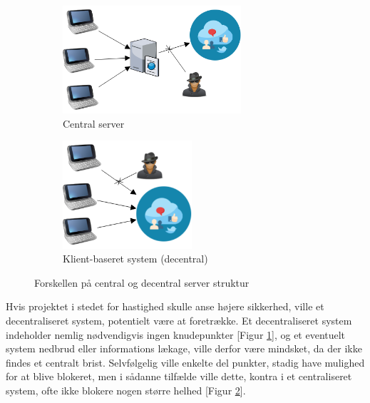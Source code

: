 \begin{figure}[H]
    \begin{subfigure}{0.5\textwidth}
        \centering
        \includegraphics[width=1\linewidth, height=4cm]{Projectdoc/Assets/Illustrationer/Security_diagram_1.png} 
        \caption{Central server}
        \label{fig:central_server}
    \end{subfigure}
    \begin{subfigure}{0.5\textwidth}
        \centering
        \includegraphics[width=0.7\linewidth, height=4cm]{Projectdoc/Assets/Illustrationer/Security_diagram_2.png}
        \caption{Klient-baseret system (decentral)}
        \label{fig:decentral_server}
    \end{subfigure}
    \caption{Forskellen på central og decentral server struktur}
    \label{fig:serverstruktur}
\end{figure}

Hvis projektet i stedet for hastighed skulle anse højere sikkerhed, ville et decentraliseret system, potentielt være at foretrække. 
Et decentraliseret system indeholder nemlig nødvendigvis ingen knudepunkter [Figur \ref{fig:central_server}], og et eventuelt system nedbrud eller informations lækage, ville derfor være mindsket, da der ikke findes et centralt brist.
Selvfølgelig ville enkelte del punkter, stadig have mulighed for at blive blokeret, men i sådanne tilfælde ville dette, kontra i et centraliseret system, ofte ikke blokere nogen større helhed [Figur \ref{fig:decentral_server}].

